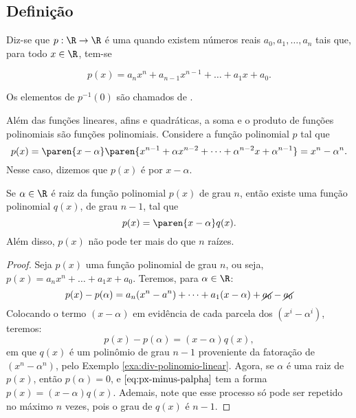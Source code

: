 \subsection{Definição}
\label{sec:definicao-funcoes-polinomiais}

\begin{definition}
Diz-se que $p: \R \to \R$ é uma  quando
existem números reais $a_0, a_1, \dots , a_n$ tais que, para todo $x
\in \R$, tem-se

\begin{equation}\label{funcpol}
p(x) = a_n x^n + a_{n-1} x^{n-1} + \dots + a_1 x + a_0.
\end{equation}

Os elementos de $p^{-1}(0)$ são chamados de .
\end{definition}

\begin{example}
\label{exa:div-polinomio-linear}
Além das funções lineares, afins e quadráticas, a soma e o produto
de funções polinomiais são funções polinomiais. Considere a função
polinomial $p$ tal que $$p(x) = \paren{x - \alpha} \paren{x^{n-1} +
\alpha x^{n-2} + \dots + \alpha^{n-2}x+ \alpha^{n-1}}=x^n -
\alpha^n.$$ Nesse caso, dizemos que $p(x)$ é  por $x-
\alpha$.
\end{example}

\begin{proposition}
\label{prop:fatoracao-polinomios}
Se $\alpha \in \R$ é raiz da função polinomial $p(x)$ de grau $n$,
então existe uma função polinomial $q(x)$, de grau $n-1$, tal que
$$p(x) = \paren{x- \alpha}q(x).$$
Além disso, $p(x)$ não pode ter mais do que $n$ raízes.
\end{proposition}

\begin{proof}
    Seja $p(x)$ uma função polinomial de grau $n$, ou seja, $p(x)=a_n x^n  + \dots + a_1x + a_0$.
    Teremos, para $\alpha \in \R$:
    \[
        p(x)-p(\alpha) = a_n(x^n-a^n) + \dots + a_1(x-\alpha) + \cancel{a_0}-\cancel{a_0}
    \]   
    Colocando o termo $(x-\alpha)$ em evidência de cada parcela dos $(x^i - \alpha^i)$, teremos:
    \begin{equation}
    \label{eq:px-minus-palpha}
        p(x)-p(\alpha) = (x-\alpha)q(x),
    \end{equation}
    \noindent em que $q(x)$ é um polinômio de grau $n-1$ proveniente da fatoração de $(x^n-\alpha^n)$,
    pelo Exemplo \ref{exa:div-polinomio-linear}. 
    Agora, se $\alpha$ é uma raiz de $p(x)$, então $p(\alpha)=0$, e $\ref{eq:px-minus-palpha}$ tem a forma
    $p(x)=(x-\alpha)q(x)$. 
    Ademais, note que esse processo só pode ser repetido no máximo $n$ vezes, pois o grau de $q(x)$ é
    $n-1$.

\end{proof}

